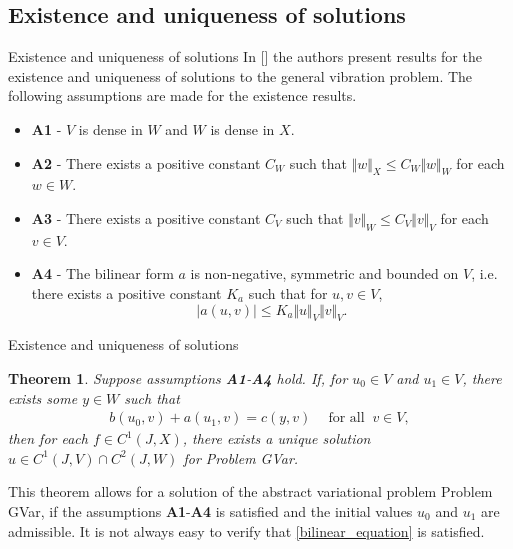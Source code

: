 \documentclass[8pt]{beamer}
\newcommand{\footfullcitenonumber}[1]{
  \footnotetext{\fullcite{#1}}
}
\begin{document}
    \subsection{Existence and uniqueness of solutions}
        \begin{frame}{Existence and uniqueness of solutions}
            In [\cite{VV02}] the authors present results for the existence and uniqueness of solutions to the general vibration problem. The following assumptions are made for the existence results.

            \begin{itemize}
                \item[] \textbf{A1} - $V$ is dense in $W$ and $W$ is dense in $X$.

                \item[] \textbf{A2} - There exists a positive constant $C_{W}$ such that $\Vert w\Vert_{X} \leq C_{W}\Vert w\Vert_{W}$ for each $ w\in W$.

                \item[] \textbf{A3} - There exists a positive constant $C_{V}$ such that $\Vert v\Vert_{W} \leq C_{V}\Vert v\Vert_{V}$ for each $v \in V$.

                \item[] \textbf{A4} - The bilinear form $a$ is non-negative, symmetric and bounded on $V$, i.e. there exists a positive constant $K_a$ such that for $\displaystyle u,v \in V$, \[|a(u,v)| \leq K_a\Vert u \Vert_V \Vert v \Vert_V.\]
            \end{itemize}
            \footfullcitenonumber{VV02}
        \end{frame}

        \begin{frame}{Existence and uniqueness of solutions}
            \newtheorem{Thmx}{Theorem}
            \begin{Thmx}
                Suppose assumptions \textbf{A1}-\textbf{A4} hold. If, for $u_0 \in V$ and $u_1 \in V$, there exists some $y \in W$ such that
                \begin{eqnarray}
                    b(u_0,v) + a(u_1,v) = c(y,v) \ \ \ \ \textrm{ for all } \ v \in V, \label{bilinear_equation}
                \end{eqnarray}
                then for each $f \in C^1(J,X)$, there exists a unique solution $u \in C^1(J,V)\cap C^2(J,W)$ for Problem GVar.
            \end{Thmx}

            This theorem allows for a solution of the abstract variational problem Problem GVar, if the assumptions \textbf{A1}-\textbf{A4} is satisfied and the initial values $u_0$ and $u_1$ are admissible. It is not always easy to verify that \eqref{bilinear_equation} is satisfied.

            \footfullcitenonumber{VV02}
        \end{frame}
\end{document}
